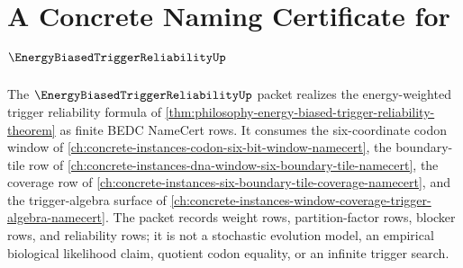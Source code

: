 \chapter{A Concrete Naming Certificate for $\EnergyBiasedTriggerReliabilityUp$}
\label{ch:concrete-instances-energy-biased-trigger-reliability-namecert}

The $\EnergyBiasedTriggerReliabilityUp$ packet realizes the energy-weighted trigger reliability formula of \autoref{thm:philosophy-energy-biased-trigger-reliability-theorem} as finite BEDC NameCert rows. It consumes the six-coordinate codon window of \autoref{ch:concrete-instances-codon-six-bit-window-namecert}, the boundary-tile row of \autoref{ch:concrete-instances-dna-window-six-boundary-tile-namecert}, the coverage row of \autoref{ch:concrete-instances-six-boundary-tile-coverage-namecert}, and the trigger-algebra surface of \autoref{ch:concrete-instances-window-coverage-trigger-algebra-namecert}. The packet records weight rows, partition-factor rows, blocker rows, and reliability rows; it is not a stochastic evolution model, an empirical biological likelihood claim, quotient codon equality, or an infinite trigger search.

